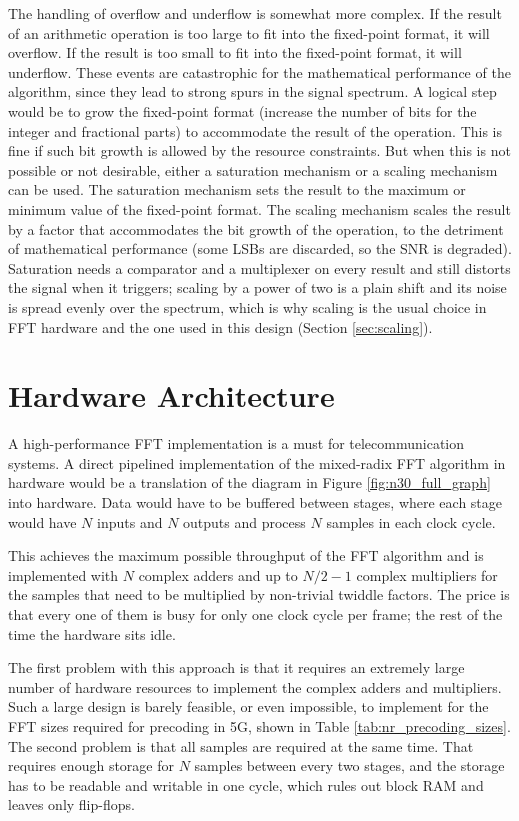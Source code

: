 \documentclass[a4paper,12pt, master]{etf}
\begin{document}
The handling of overflow and underflow is somewhat more complex. If the result of an arithmetic operation is too large to fit into the fixed-point format, it will overflow. If the result is too small to fit into the fixed-point format, it will underflow. These events are catastrophic for the mathematical performance of the algorithm, since they lead to strong spurs in the signal spectrum.
A logical step would be to grow the fixed-point format (increase the number of bits for the integer and fractional parts) to accommodate the result of the operation. This is fine if such bit growth is allowed by the resource constraints. But when this is not possible or not desirable, either a saturation mechanism or a scaling mechanism can be used. The saturation mechanism sets the result to the maximum or minimum value of the fixed-point format. The scaling mechanism scales the result by a factor that accommodates the bit growth of the operation, to the detriment of mathematical performance (some LSBs are discarded, so the SNR is degraded). Saturation needs a comparator and a multiplexer on every result and still distorts the signal when it triggers; scaling by a power of two is a plain shift and its noise is spread evenly over the spectrum, which is why scaling is the usual choice in FFT hardware and the one used in this design (Section \ref{sec:scaling}).

\chapter{Hardware Architecture}
\label{ch:hardware_architecture}
A high-performance FFT implementation is a must for telecommunication systems. A direct pipelined implementation of the mixed-radix FFT algorithm in hardware would be a translation of the diagram in Figure \ref{fig:n30_full_graph} into hardware. Data would have to be buffered between stages, where each stage would have $N$ inputs and $N$ outputs and process $N$ samples in each clock cycle.

This achieves the maximum possible throughput of the FFT algorithm and is implemented with $N$ complex adders and up to $N/2-1$ complex multipliers for the samples that need to be multiplied by non-trivial twiddle factors. The price is that every one of them is busy for only one clock cycle per frame; the rest of the time the hardware sits idle.

The first problem with this approach is that it requires an extremely large number of hardware resources to implement the complex adders and multipliers. Such a large design is barely feasible, or even impossible, to implement for the FFT sizes required for precoding in 5G, shown in Table \ref{tab:nr_precoding_sizes}.
The second problem is that all samples are required at the same time. That requires enough storage for $N$ samples between every two stages, and the storage has to be readable and writable in one cycle, which rules out block RAM and leaves only flip-flops.
\end{document}
